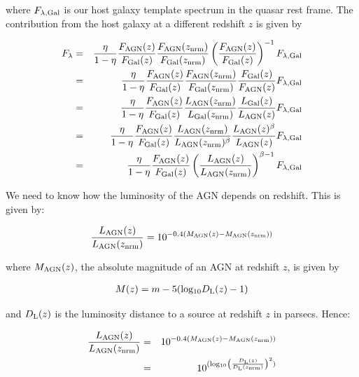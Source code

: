 where $F_{\lambda,{\rm Gal}}$ is our host galaxy template spectrum in the quasar rest frame. The contribution from the host galaxy at a different redshift $z$ is given by  

\begin{eqnarray}
  F_{\lambda} & = & \frac{\eta}{1 - \eta} \frac{F_{\rm AGN}(z)}{F_{\rm Gal}(z)} \frac{F_{\rm AGN}(z_{\rm nrm})}{F_{\rm Gal}(z_{\rm nrm})} \left( \frac{F_{\rm AGN}(z)}{F_{\rm Gal}(z)} \right)^{-1}  F_{\lambda,{\rm Gal}} \\ 
& = &  \frac{\eta}{1 - \eta} \frac{F_{\rm AGN}(z)}{F_{\rm Gal}(z)} \frac{F_{\rm AGN}(z_{\rm nrm})}{F_{\rm Gal}(z_{\rm nrm})}  \frac{F_{\rm Gal}(z)}{F_{\rm AGN}(z)}   F_{\lambda,{\rm Gal}} \\ & = &  \frac{\eta}{1 - \eta} \frac{F_{\rm AGN}(z)}{F_{\rm Gal}(z)} \frac{L_{\rm AGN}(z_{\rm nrm})}{L_{\rm Gal}(z_{\rm nrm})}  \frac{L_{\rm Gal}(z)}{L_{\rm AGN}(z)}  F_{\lambda,{\rm Gal}}  \\ & = & \frac{\eta}{1 - \eta} \frac{F_{\rm AGN}(z)}{F_{\rm Gal}(z)} \frac{L_{\rm AGN}(z_{\rm nrm})}{L_{\rm AGN}(z_{\rm nrm})^\beta}  \frac{L_{\rm AGN}(z)^\beta}{L_{\rm AGN}(z)}  F_{\lambda,{\rm Gal}} \\ & = &  \frac{\eta}{1 - \eta} \frac{F_{\rm AGN}(z)}{F_{\rm Gal}(z)} \left( \frac{L_{\rm AGN}(z)}{L_{\rm AGN}(z_{\rm nrm})} \right)^{\beta - 1}  F_{\lambda,{\rm Gal}}
\end{eqnarray}

We need to know how the luminosity of the AGN depends on redshift. This is given by:

\begin{eqnarray}
  \frac{L_{\rm AGN}(z)}{L_{\rm AGN}(z_{\rm nrm})} = 10^{-0.4(M_{\rm AGN}(z)-M_{\rm AGN}(z_{\rm nrm}))}
\end{eqnarray}

where $M_{\rm AGN}(z)$, the absolute magnitude of an AGN at redshift $z$, is given by

\begin{eqnarray}
  M(z) = m - 5({\rm log_{10}}D_{\rm L}(z) - 1)
\end{eqnarray}

and $D_{\rm L}(z)$ is the luminosity distance to a source at redshift $z$ in parsecs. Hence:

\begin{eqnarray}
  \frac{L_{\rm AGN}(z)}{L_{\rm AGN}(z_{\rm nrm})} & = & 10^{-0.4(M_{\rm AGN}(z)-M_{\rm AGN}(z_{\rm nrm}))} \\
  & = & 10^{({\rm log_{10}} \left( \frac{D_{\rm L}(z)}{D_{\rm L}(z_{\rm nrm})} \right)^2 )}
\end{eqnarray}
 

